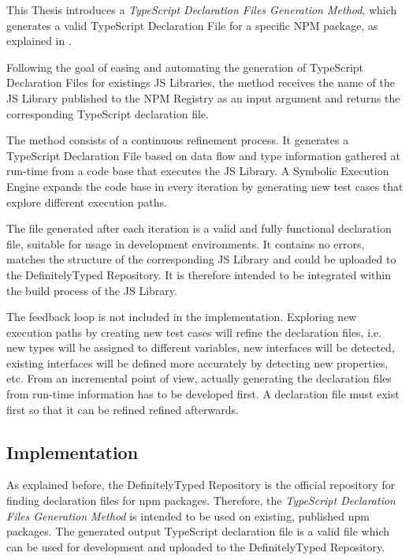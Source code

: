This Thesis introduces a \textit{TypeScript Declaration Files Generation Method}, which generates a valid TypeScript Declaration File for a specific NPM package, as explained in .



Following the goal of easing and automating the generation of TypeScript Declaration Files for existings JS Libraries, the method receives the name of the JS Library published to the NPM Registry as an input argument and returns the corresponding TypeScript declaration file.

The method consists of a continuous refinement process. It generates a TypeScript Declaration File based on data flow and type information gathered at run-time from a code base that executes the JS Library. A Symbolic Execution Engine expands the code base in every iteration by generating new test cases that explore different execution paths.

The file generated after each iteration is a valid and fully functional declaration file, suitable for usage in development environments. It contains no errors, matches the structure of the corresponding JS Library and could be uploaded to the DefinitelyTyped Repository. It is therefore intended to be integrated within the build process of the JS Library.

The feedback loop is not included in the implementation. Exploring new execution paths by creating new test cases will refine the declaration files, i.e. new types will be assigned to different variables, new interfaces will be detected, existing interfaces will be defined more accurately by detecting new properties, etc. From an incremental point of view, actually generating the declaration files from run-time information has to be developed first. A declaration file must exist first so that it can be refined refined afterwards. 




\subsection{Implementation}
As explained before, the DefinitelyTyped Repository is the official repository for finding declaration files for npm packages. Therefore, the \textit{TypeScript Declaration Files Generation Method} is intended to be used on existing, published npm packages. The generated output TypeScript declaration file is a valid file which can be used for development and uploaded to the DefinitelyTyped Repository.

